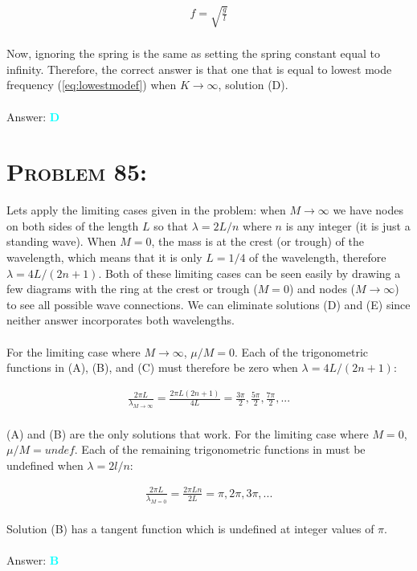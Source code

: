 \documentclass{article}
\begin{document}
\begin{gather}
\label{eq:lowestmodef}f = \sqrt{\frac{g}{l}}
\end{gather}
\\
Now, ignoring the spring is the same as setting the spring constant equal to infinity.  Therefore, the correct answer is that one that is equal to lowest mode frequency (\ref{eq:lowestmodef}) when $K \rightarrow \infty$, solution (D).
\\\\
Answer: \textbf{\textcolor{cyan}D}\\


\section{\textsc{Problem 85:}} Lets apply the limiting cases given in the problem: when $M \rightarrow \infty$ we have nodes on both sides of the length $L$ so that $\lambda = 2L/n$ where $n$ is any integer (it is just a standing wave). When $M = 0$, the mass is at the crest (or trough) of the wavelength, which means that it is only $L = 1/4$ of the wavelength, therefore $\lambda = 4L/(2n+1)$. Both of these limiting cases can be seen easily by drawing a few diagrams with the ring at the crest or trough ($M = 0$) and nodes ($M \rightarrow \infty$) to see all possible wave connections. We can eliminate solutions (D) and (E) since neither answer incorporates both wavelengths.\\\\
For the limiting case where $M \rightarrow \infty$, $\mu / M = 0$. Each of the trigonometric functions in (A), (B), and (C) must therefore be zero when $\lambda = 4L/(2n+1)$:

\begin{gather}
\frac{2\pi L}{\lambda_{M \rightarrow \infty}} = \frac{2\pi L (2n+1)}{4L} = \frac{3\pi}{2}, \frac{5\pi}{2}, \frac{7\pi}{2}, ... \nonumber
\end{gather}
\\
(A) and (B) are the only solutions that work. For the limiting case where $M = 0$, $\mu / M = undef$. Each of the remaining trigonometric functions in must be undefined when $\lambda = 2l/n$:

\begin{gather}
\frac{2 \pi L}{\lambda_{M=0}} = \frac{2 \pi L n}{2L} = \pi, 2\pi, 3\pi, ... \nonumber
\end{gather}
\\
Solution (B) has a tangent function which is undefined at integer values of $\pi$.
\\\\
Answer: \textbf{\textcolor{cyan}B}\\
\end{document}
